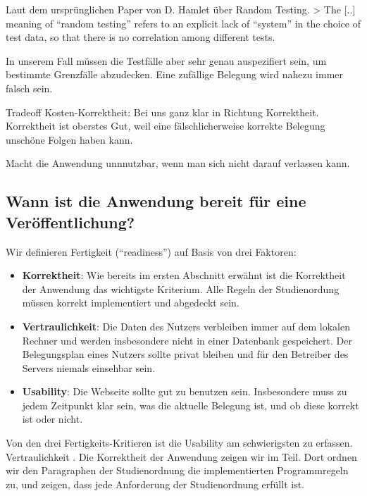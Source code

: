 \documentclass[ngerman]{article}
\begin{document}
Laut dem ursprünglichen Paper von D. Hamlet über Random Testing.
\textgreater{} The {[}..{]} meaning of ``random testing'' refers to an
explicit lack of ``system'' in the choice of test data, so that there is
no correlation among different tests.

In unserem Fall müssen die Testfälle aber sehr genau auspezifiert sein, um bestimmte Grenzfälle abzudecken. Eine zufällige Belegung wird nahezu immer falsch sein.

Tradeoff Kosten-Korrektheit: Bei uns ganz klar in Richtung Korrektheit.
Korrektheit ist oberstes Gut, weil eine fälschlicherweise korrekte Belegung unschöne Folgen haben kann.

Macht die Anwendung unnnutzbar, wenn man sich nicht darauf verlassen kann.

\subsection{Wann ist die Anwendung bereit für eine Veröffentlichung?}

Wir definieren Fertigkeit (``readiness'') auf Basis von drei Faktoren:

\begin{itemize}
    \item \textbf{Korrektheit}:
        Wie bereits im ersten Abschnitt erwähnt ist die Korrektheit der Anwendung das wichtigste Kriterium.
        Alle Regeln der Studienordung müssen korrekt implementiert und abgedeckt sein.
    \item \textbf{Vertraulichkeit}:
        Die Daten des Nutzers verbleiben immer auf dem lokalen Rechner und werden insbesondere nicht in einer Datenbank gespeichert.
        Der Belegungsplan eines Nutzers sollte privat bleiben und für den Betreiber des Servers niemals einsehbar sein.
    \item \textbf{Usability}:
        Die Webseite sollte gut zu benutzen sein.
        Insbesondere muss zu jedem Zeitpunkt klar sein, was die aktuelle Belegung ist, und ob diese korrekt ist oder nicht.
\end{itemize}

Von den drei Fertigkeits-Kritieren ist die Usability am schwierigsten zu erfassen.
Vertraulichkeit .
Die Korrektheit der Anwendung zeigen wir im  Teil.
Dort ordnen wir den Paragraphen der Studienordnung die implementierten Programmregeln zu, und zeigen, dass jede Anforderung der Studienordnung erfüllt ist.
\end{document}
